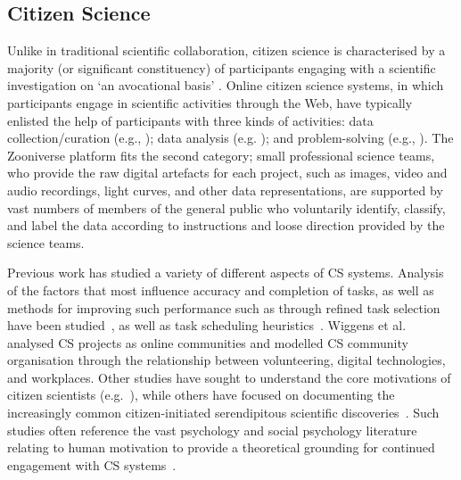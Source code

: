 \documentclass{sigchi}
\begin{document}
\begin{spacing}{0.97}
\subsection{Citizen Science}
Unlike in traditional scientific collaboration, citizen science is characterised by a majority (or significant constituency) of participants engaging with a scientific investigation on `an avocational basis' \cite{CSDefinition2011}. Online citizen science systems, in which participants engage in scientific activities through the Web, have typically enlisted the help of participants with three kinds of activities: data collection/curation (e.g., \cite{zook2010volunteered}); data analysis (e.g. \cite{westphal2005stardust,heinzelman2010crowdsourcing}); and problem-solving (e.g., \cite{khatib2011algorithm,cordero2012rna}). The Zooniverse platform \cite{fortson2011galaxy} fits the second category; small professional science teams, who provide the raw digital artefacts for each project, such as images, video and audio recordings, light curves, and other data representations, are supported by vast numbers of members of the general public who voluntarily identify, classify, and label the data according to instructions and loose direction provided by the science teams. 

Previous work has studied a variety of different aspects of CS systems. Analysis of the factors that most influence accuracy and completion of tasks, as well as methods for improving such performance such as through refined task selection have been studied~\cite{ebird,kawrykow2012}, as well as task scheduling heuristics~\cite{khatib2011algorithm}. Wiggens et al.~\cite{wiggins2011conservation} analysed CS projects as online communities and modelled CS community organisation through the relationship between volunteering, digital technologies, and workplaces. Other studies have sought to understand the core motivations of citizen scientists (e.g.~\cite{raddick2008galaxy,rotman2012}), while others have focused on documenting the increasingly common citizen-initiated serendipitous scientific discoveries~\cite{schwamb2013planet}. Such studies often reference the vast psychology and social psychology literature relating to human motivation to provide a theoretical grounding for continued engagement with CS systems~\cite{Winfried2009}.



\end{spacing}
\end{document}
